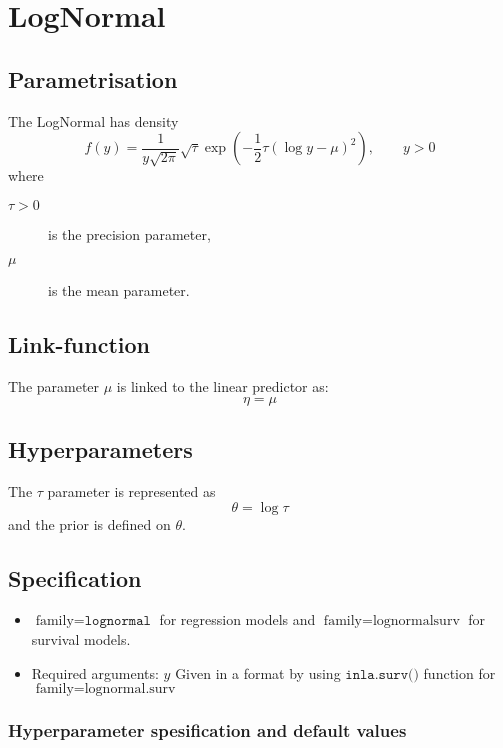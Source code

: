 \documentclass[a4paper,11pt]{article}
\begin{document}
\section*{LogNormal}

\subsection*{Parametrisation}

The LogNormal has density
\begin{displaymath}
    f(y) = \frac{1}{y\sqrt{2\pi}} \sqrt{\tau} \exp\left(
      -\frac{1}{2} \tau (\log y - \mu)^{2}
    \right), \qquad y > 0
\end{displaymath}
where
\begin{description}
\item[$\tau > 0$] is the precision parameter,
\item[$\mu$] is the mean parameter.
\end{description}

\subsection*{Link-function}

The parameter $\mu$ is linked to the linear predictor as:
\[
\eta = \mu
\]
\subsection*{Hyperparameters}

The $\tau$ parameter is represented as
\[
\theta = \log\tau
\]
and the prior is defined on $\theta$.

\subsection*{Specification}

\begin{itemize}
\item $\text{family}=\texttt{lognormal}$ for regression models and
    $\text{family}=\text{lognormalsurv}$ for survival models.
\item Required arguments: $y$ Given in a format by using
    $\texttt{inla.surv()}$ function for
    $\text{family}=\text{lognormal.surv}$
\end{itemize}

\subsubsection*{Hyperparameter spesification and default values}


\end{document}
